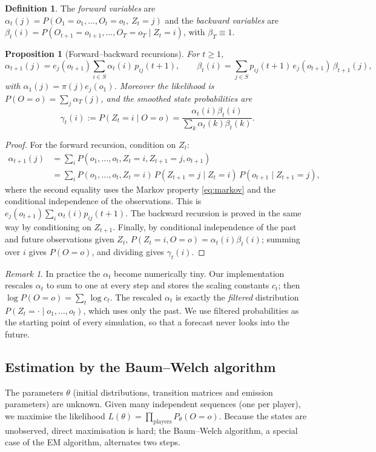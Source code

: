 \documentclass[11pt]{amsart}
\newtheorem{proposition}[theorem]{Proposition}
\theoremstyle{definition}
\newtheorem{definition}[theorem]{Definition}
\theoremstyle{remark}
\newtheorem{remark}[theorem]{Remark}
\begin{document}
\begin{definition}
The \emph{forward variables} are $\alpha_t(j)=P(O_1=o_1,\dots,O_t=o_t,\ Z_t=j)$ and the \emph{backward variables} are $\beta_t(i)=P(O_{t+1}=o_{t+1},\dots,O_T=o_T\mid Z_t=i)$, with $\beta_T\equiv 1$.
\end{definition}

\begin{proposition}[Forward--backward recursions]\label{prop:fb}
For $t\ge 1$,
\[
\alpha_{t+1}(j) = e_j(o_{t+1})\sum_{i\in S}\alpha_t(i)\,p_{ij}(t+1),\qquad
\beta_t(i) = \sum_{j\in S} p_{ij}(t+1)\,e_j(o_{t+1})\,\beta_{t+1}(j),
\]
with $\alpha_1(j)=\pi(j)e_j(o_1)$. Moreover the likelihood is $P(O=o)=\sum_j\alpha_T(j)$, and the \emph{smoothed} state probabilities are
\[
\gamma_t(i) := P(Z_t=i\mid O=o) = \frac{\alpha_t(i)\beta_t(i)}{\sum_k \alpha_t(k)\beta_t(k)}.
\]
\end{proposition}

\begin{proof}
For the forward recursion, condition on $Z_t$:
\begin{align*}
\alpha_{t+1}(j) &= \sum_i P(o_1,\dots,o_t, Z_t=i, Z_{t+1}=j, o_{t+1})\\
&= \sum_i P(o_1,\dots,o_t,Z_t=i)\,P(Z_{t+1}=j\mid Z_t=i)\,P(o_{t+1}\mid Z_{t+1}=j),
\end{align*}
where the second equality uses the Markov property \eqref{eq:markov} and the conditional independence of the observations. This is $e_j(o_{t+1})\sum_i\alpha_t(i)p_{ij}(t+1)$. The backward recursion is proved in the same way by conditioning on $Z_{t+1}$. Finally, by conditional independence of the past and future observations given $Z_t$,
$P(Z_t=i, O=o)=\alpha_t(i)\beta_t(i)$; summing over $i$ gives $P(O=o)$, and dividing gives $\gamma_t(i)$.
\end{proof}

\begin{remark}
In practice the $\alpha_t$ become numerically tiny. Our implementation rescales $\alpha_t$ to sum to one at every step and stores the scaling constants $c_t$; then $\log P(O=o)=\sum_t\log c_t$. The rescaled $\alpha_t$ is exactly the \emph{filtered} distribution $P(Z_t=\cdot\mid o_1,\dots,o_t)$, which uses only the past. We use filtered probabilities as the starting point of every simulation, so that a forecast never looks into the future.
\end{remark}

\subsection{Estimation by the Baum--Welch algorithm}
The parameters $\theta$ (initial distributions, transition matrices and emission parameters) are unknown. Given many independent sequences (one per player), we maximise the likelihood $L(\theta)=\prod_{\text{players}}P_\theta(O=o)$. Because the states are unobserved, direct maximisation is hard; the Baum--Welch algorithm, a special case of the EM algorithm, alternates two steps.
\end{document}
